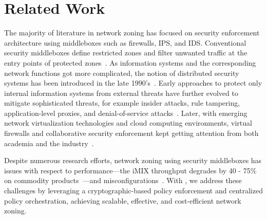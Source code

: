 \chapter{Related Work}
\label{related}


The majority of literature in network zoning has focused on security enforcement architecture using middleboxes such as firewalls, IPS, and IDS.
Conventional security middleboxes define restricted zones and filter unwanted traffic at the entry points of protected zones~\cite{cheswick1994firewalls}. 
As information systems and the corresponding network functions got more complicated, the notion of distributed security systems has been introduced in the late 1990's~\cite{bellovin1999distributed}.
Early approaches to protect only internal information systems from external threats have further evolved to mitigate sophisticated threats, for example insider attacks, rule tampering, application-level proxies, and denial-of-service attacks~\cite{markham2001security}.
Later, with emerging network virtualization technologies and cloud computing environments, virtual firewalls and collaborative security enforcement kept getting attention from both academia and the industry~\cite{liu2008collaborative,yu2017psi}. 

Despite numerous research efforts, network zoning using security middleboxes has issues with respect to performance---the iMIX throughput degrades by 40 - 75\% on commodity products~\cite{juniper2020comparison}---and misconfigurations~\cite{fayaz2016buzz,tschaen2016sfc,yuan2020netsmc}. 
With \name, we address these challenges by leveraging a cryptographic-based policy enforcement and centralized policy orchestration, achieving scalable, effective, and cost-efficient network zoning.


